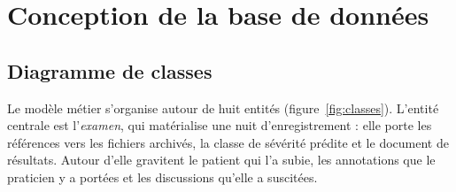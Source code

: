 \section{Conception de la base de données}

\subsection{Diagramme de classes}

Le modèle métier s'organise autour de huit entités
(figure~\ref{fig:classes}). L'entité centrale est l'\emph{examen}, qui matérialise une
nuit d'enregistrement : elle porte les références vers les fichiers archivés, la
classe de sévérité prédite et le document de résultats. Autour d'elle gravitent le
patient qui l'a subie, les annotations que le praticien y a portées et les
discussions qu'elle a suscitées.

